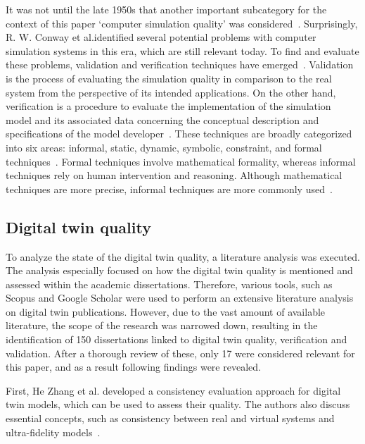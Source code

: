 \documentclass{llncs}
\begin{document}
    It was not until the late 1950s that another important subcategory for the context of this paper `computer simulation quality' 
    was considered~\cite{SomeProblemsofDigitalSystemsSimulation}.
    Surprisingly, R. W. Conway et al.identified several potential problems with computer 
    simulation systems in this era, which are still relevant today.  
    To find and evaluate these problems,
    validation and verification techniques have emerged~\cite{StewartSimulation,VerificationValidationSergent,OsmanBalci}. 
    Validation is the process of evaluating the simulation quality in comparison to the real system from the perspective of its intended applications. 
    On the other hand, verification is a procedure to evaluate the implementation of the simulation model and its associated data concerning the conceptual description and specifications of 
    the model developer~\cite{StewartSimulation,VerificationValidationSergent}.
    These techniques are broadly categorized into six areas: informal, static, dynamic, symbolic, constraint, 
    and formal techniques~\cite{balcicategories,balcitechniques}. Formal techniques involve mathematical formality, 
    whereas informal techniques rely on human intervention and reasoning. 
    Although mathematical techniques are more precise, informal techniques are more commonly used~\cite{balcicategories}.

    \subsection{Digital twin quality}
    To analyze the state of the digital twin quality, a literature analysis was executed. 
    The analysis especially focused on how the digital twin quality is mentioned and assessed 
    within the academic dissertations. Therefore, various tools, such as Scopus and Google Scholar were 
    used to perform an extensive literature analysis on digital twin publications. However, due to the vast amount of available literature, the scope of the research was narrowed down, resulting in the identification of 
    150 dissertations linked to digital twin quality, verification and validation. 
    After a thorough review of these, only 17 were considered relevant for this paper,
    and as a result following findings were revealed.
  
    First, He Zhang et al. developed a consistency evaluation approach for digital 
    twin models, which can be used to assess their quality. 
    The authors also discuss essential concepts, such as consistency between real and 
    virtual systems and ultra-fidelity models~\cite{ZHANGEVALUATIONMETHOD}. 
\end{document}
